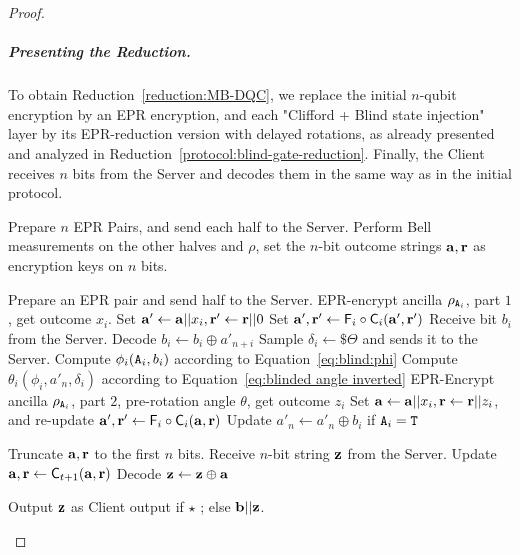 \begin{proof}
    \subparagraph{Presenting the Reduction.}
    To obtain Reduction~\ref{reduction:MB-DQC}, we replace the initial $n$-qubit encryption by an EPR encryption, and each "Clifford + Blind state injection" layer by its EPR-reduction version with delayed rotations, as already presented and analyzed in Reduction~\ref{protocol:blind-gate-reduction}. Finally, the Client receives $n$ bits from the Server and decodes them in the same way as in the initial protocol.

    \begin{reduction}
    \caption{MB-DQC, EPR-reduction and delayed rotations}
    \label{reduction:MB-DQC}
    \begin{algorithmic}[1]
        \State Prepare $n$ EPR Pairs, and send each half to the Server.
        \State Perform Bell measurements on the other halves and $\rho$, set the $n$-bit outcome strings $\mathbf a, \mathbf r$ as encryption keys on $n$ bits.
        \EndProcedure


        \State Prepare an EPR pair and send half to the Server.
        \State EPR-encrypt ancilla $\rho_{\mathtt{A}_i}$, part $1$, get outcome $x_i$.
        \State Set $\mathbf a'\gets \mathbf a||x_i, \mathbf r'\gets \mathbf r||0$
        \State Set $\mathbf a', \mathbf r'\gets \mathsf{F}_i\circ\mathsf{C}_{i}(\mathbf a', \mathbf r')$
        \State Receive bit $b_i$ from the Server.
        \State Decode $b_i \gets b_i \oplus a'_{n+i}$
        \State Sample $\delta_i \gets \$\Theta$ and sends it to the Server.
        \State Compute $\phi_i(\mathtt{A}_i, b_i)$ according to Equation~\ref{eq:blind:phi}
        \State Compute $\theta_i(\phi_i, a'_n, \delta_i)$ according to Equation~\ref{eq:blinded angle inverted}
        \State EPR-Encrypt ancilla $\rho_{\mathtt{A}_i}$, part $2$, pre-rotation angle $\theta$, get outcome $z_i$
        \State Set $\mathbf a\gets\mathbf a||x_i, \mathbf r\gets \mathbf r||z_i$, and re-update $\mathbf a', \mathbf r'\gets \mathsf{F}_i\circ \mathsf{C}_i(\mathbf a, \mathbf r)$
        \State Update $a'_n \gets a'_n\oplus b_i$ if $\mathtt{A}_i=\mathtt{T}$

        \EndFor
        \EndProcedure

        \State Truncate $\mathbf a, \mathbf r$ to the first $n$ bits.
        \State Receive $n$-bit string $\mathbf z$ from the Server.
        \State Update $\mathbf a, \mathbf r\gets \mathsf{C}_{t+1}(\mathbf a, \mathbf r)$
        \State Decode $\mathbf z\gets \mathbf z\oplus \mathbf a$
        \EndProcedure

        \State Output $\mathbf z$ as Client output if $\star$ ; else $\mathbf b||\mathbf z$.
    \end{algorithmic}
    \end{reduction}


\end{proof}
